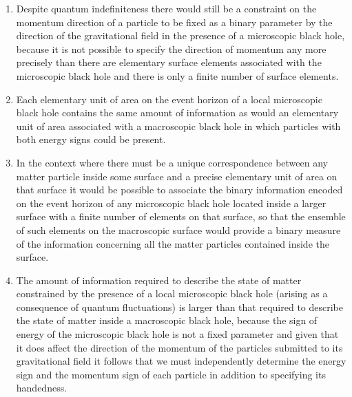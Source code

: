 \documentclass[notitlepage,12pt]{report}
\begin{document}
\begin{enumerate}
\item Despite quantum indefiniteness there would still be a constraint on the momentum direction of a particle to be fixed as a binary parameter by the direction of the gravitational field in the presence of a microscopic black hole, because it is not possible to specify the direction of momentum any more precisely than there are elementary surface elements associated with the microscopic black hole and there is only a finite number of surface elements.

\item Each elementary unit of area on the event horizon of a local microscopic black hole contains the same amount of information as would an elementary unit of area associated with a macroscopic black hole in which particles with both energy signs could be present.

\item In the context where there must be a unique correspondence between any matter particle inside some surface and a precise elementary unit of area on that surface it would be possible to associate the binary information encoded on the event horizon of any microscopic black hole located inside a larger surface with a finite number of elements on that surface, so that the ensemble of such elements on the macroscopic surface would provide a binary measure of the information concerning all the matter particles contained inside the surface. 

\item The amount of information required to describe the state of matter constrained by the presence of a local microscopic black hole (arising as a consequence of quantum fluctuations) is larger than that required to describe the state of matter inside a macroscopic black hole, because the sign of energy of the microscopic black hole is not a fixed parameter and given that it does affect the direction of the momentum of the particles submitted to its gravitational field it follows that we must independently determine the energy sign and the momentum sign of each particle in addition to specifying its handedness.


\end{enumerate}
\end{document}
